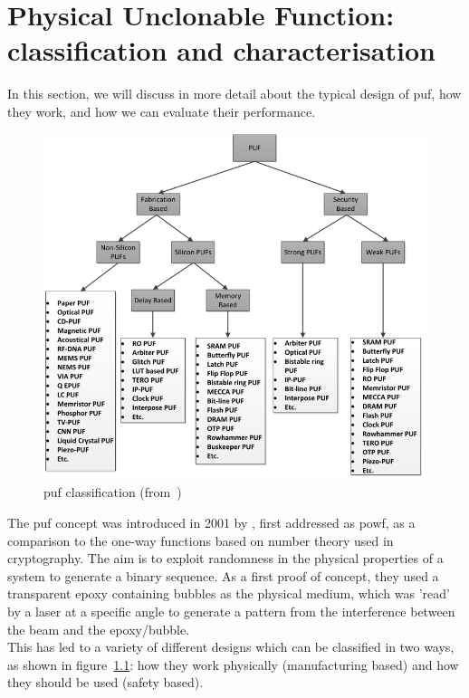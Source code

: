 \chapter{Physical Unclonable Function: classification and characterisation}
\label{ch:1-puf}


In this section, we will discuss in more detail about the typical design of \acrshort{puf}, how they work, and how we can evaluate their performance.

\begin{figure}[H]
    \centering
    \includegraphics[width=0.84\linewidth]{images/full_puf_overview.png}
    \caption{\acrshort{puf} classification (from~\cite{anandakumar_fpga-based_2021})}
    \label{fig:PUF_ALL}
\end{figure}

The \acrshort{puf} concept was introduced in 2001 by \cite{pappu_physical_2001, pappu_physical_2002}, first addressed as \acrfull{powf}, as a comparison to the one-way functions based on number theory used in cryptography. The aim is to exploit randomness in the physical properties of a system to generate a binary sequence. As a first proof of concept, they used a transparent epoxy containing bubbles as the physical medium, which was 'read' by a laser at a specific angle to generate a pattern from the interference between the beam and the epoxy/bubble.\\

This has led to a variety of different designs which can be classified in two ways, as shown in figure~\ref{fig:PUF_ALL}: how they work physically (manufacturing based) and how they should be used (safety based).

